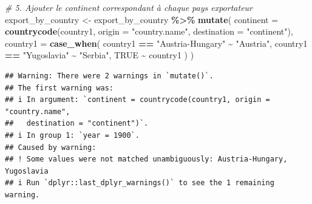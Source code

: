 \documentclass[
]{article}
\newenvironment{Shaded}{\begin{snugshade}}{\end{snugshade}}
\newcommand{\AttributeTok}[1]{\textcolor[rgb]{0.13,0.29,0.53}{#1}}
\newcommand{\CommentTok}[1]{\textcolor[rgb]{0.56,0.35,0.01}{\textit{#1}}}
\newcommand{\ConstantTok}[1]{\textcolor[rgb]{0.56,0.35,0.01}{#1}}
\newcommand{\FunctionTok}[1]{\textcolor[rgb]{0.13,0.29,0.53}{\textbf{#1}}}
\newcommand{\NormalTok}[1]{#1}
\newcommand{\OtherTok}[1]{\textcolor[rgb]{0.56,0.35,0.01}{#1}}
\newcommand{\SpecialCharTok}[1]{\textcolor[rgb]{0.81,0.36,0.00}{\textbf{#1}}}
\newcommand{\StringTok}[1]{\textcolor[rgb]{0.31,0.60,0.02}{#1}}
\begin{document}
\begin{Shaded}
\begin{Highlighting}[]
\CommentTok{\# 5. Ajouter le continent correspondant à chaque pays exportateur}
\NormalTok{export\_by\_country }\OtherTok{\textless{}{-}}\NormalTok{ export\_by\_country }\SpecialCharTok{\%\textgreater{}\%}
  \FunctionTok{mutate}\NormalTok{(}
    \AttributeTok{continent =} \FunctionTok{countrycode}\NormalTok{(country1, }\AttributeTok{origin =} \StringTok{"country.name"}\NormalTok{, }\AttributeTok{destination =} \StringTok{"continent"}\NormalTok{),}
    \AttributeTok{country1 =} \FunctionTok{case\_when}\NormalTok{(}
\NormalTok{      country1 }\SpecialCharTok{==} \StringTok{"Austria{-}Hungary"} \SpecialCharTok{\textasciitilde{}} \StringTok{"Austria"}\NormalTok{,}
\NormalTok{      country1 }\SpecialCharTok{==} \StringTok{"Yugoslavia"} \SpecialCharTok{\textasciitilde{}} \StringTok{"Serbia"}\NormalTok{,}
      \ConstantTok{TRUE} \SpecialCharTok{\textasciitilde{}}\NormalTok{ country1}
\NormalTok{    )}
\NormalTok{  )}
\end{Highlighting}
\end{Shaded}

\begin{verbatim}
## Warning: There were 2 warnings in `mutate()`.
## The first warning was:
## i In argument: `continent = countrycode(country1, origin = "country.name",
##   destination = "continent")`.
## i In group 1: `year = 1900`.
## Caused by warning:
## ! Some values were not matched unambiguously: Austria-Hungary, Yugoslavia
## i Run `dplyr::last_dplyr_warnings()` to see the 1 remaining warning.
\end{verbatim}
\end{document}
